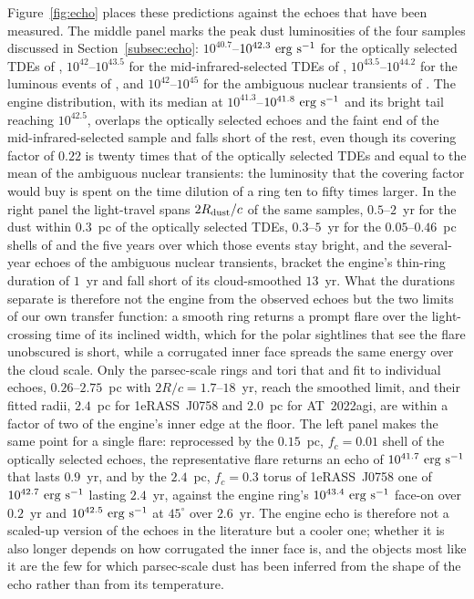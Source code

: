 \documentclass[twocolumn,pdftex]{aastex701}
\begin{document}
Figure~\ref{fig:echo} places these predictions against the echoes that have been measured. The middle panel marks the peak dust luminosities of the four samples discussed in Section~\ref{subsec:echo}: $10^{40.7}$--$10^{42.3}~{\rm erg~s^{-1}}$ for the optically selected TDEs of \citet{Jiang:2021b}, $10^{42}$--$10^{43.5}$ for the mid-infrared-selected TDEs of \citet{Masterson:2024a}, $10^{43.5}$--$10^{44.2}$ for the luminous events of \citet{Nair:2026a}, and $10^{42}$--$10^{45}$ for the ambiguous nuclear transients of \citet{Hinkle:2024b}. The engine distribution, with its median at $10^{41.3}$--$10^{41.8}~{\rm erg~s^{-1}}$ and its bright tail reaching $10^{42.5}$, overlaps the optically selected echoes and the faint end of the mid-infrared-selected sample and falls short of the rest, even though its covering factor of $0.22$ is twenty times that of the optically selected TDEs and equal to the mean of the ambiguous nuclear transients: the luminosity that the covering factor would buy is spent on the time dilution of a ring ten to fifty times larger. In the right panel the light-travel spans $2 R_{\rm dust}/c$ of the same samples, $0.5$--$2$~yr for the dust within $0.3$~pc of the optically selected TDEs, $0.3$--$5$~yr for the $0.05$--$0.46$~pc shells of \citet{Masterson:2024a} and the five years over which those events stay bright, and the several-year echoes of the ambiguous nuclear transients, bracket the engine's thin-ring duration of $1$~yr and fall short of its cloud-smoothed $13$~yr. What the durations separate is therefore not the engine from the observed echoes but the two limits of our own transfer function: a smooth ring returns a prompt flare over the light-crossing time of its inclined width, which for the polar sightlines that see the flare unobscured is short, while a corrugated inner face spreads the same energy over the cloud scale. Only the parsec-scale rings and tori that \citet{Eyles-Ferris:2026a} and \citet{Wu:2026a} fit to individual echoes, $0.26$--$2.75$~pc with $2R/c = 1.7$--$18$~yr, reach the smoothed limit, and their fitted radii, $2.4$~pc for 1eRASS~J0758 and $2.0$~pc for AT~2022agi, are within a factor of two of the engine's inner edge at the floor. The left panel makes the same point for a single flare: reprocessed by the $0.15$~pc, $f_c = 0.01$ shell of the optically selected echoes, the representative flare returns an echo of $10^{41.7}~{\rm erg~s^{-1}}$ that lasts $0.9$~yr, and by the $2.4$~pc, $f_c = 0.3$ torus of 1eRASS~J0758 one of $10^{42.7}~{\rm erg~s^{-1}}$ lasting $2.4$~yr, against the engine ring's $10^{43.4}~{\rm erg~s^{-1}}$ face-on over $0.2$~yr and $10^{42.5}~{\rm erg~s^{-1}}$ at $45^{\circ}$ over $2.6$~yr. The engine echo is therefore not a scaled-up version of the echoes in the literature but a cooler one; whether it is also longer depends on how corrugated the inner face is, and the objects most like it are the few for which parsec-scale dust has been inferred from the shape of the echo rather than from its temperature.
\end{document}
